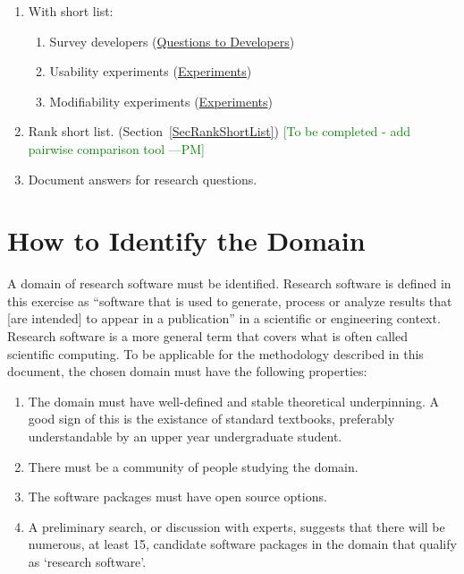 \documentclass[letterpaper,cleveref]{lipics-v2019}
\newcommand{\authornote}[3]{\textcolor{#1}{[#3 ---#2]}}
\newcommand{\authornote}[3]{}
\newcommand{\wss}[1]{\authornote{blue}{SS}{#1}} %
\newcommand{\pmi}[1]{\authornote{green}{PM}{#1}} %
\theoremstyle{definition}
\begin{document}
\begin{enumerate}
\item With short list:
\begin{enumerate}
\item Survey developers
  (\href{https://github.com/smiths/AIMSS/blob/master/StateOfPractice/Methodology/Questions
    to Developers.pdf}{Questions to Developers})
\item Usability experiments
  (\href{https://github.com/smiths/AIMSS/blob/master/StateOfPractice/Methodology/Experiments.pdf}{Experiments})
\item Modifiability experiments
  (\href{https://github.com/smiths/AIMSS/blob/master/StateOfPractice/Methodology/Experiments.pdf}{Experiments})
\end{enumerate}
\item Rank short list. (Section~\ref{SecRankShortList}) \pmi{To be completed -
    add pairwise comparison tool}
\item Document answers for research questions.
\end{enumerate}


\section{How to Identify the Domain} \label{SecIdentifyDomain} 

A domain of research software must be identified. Research software is defined
in this exercise as ``software that is used to generate, process or analyze
results that [are intended] to appear in a publication'' \citep{hettrick2014uk}
in a scientific or engineering context.  Research software is a more general
term that covers what is often called scientific computing.  To be applicable
for the methodology described in this document, the chosen domain must have the
following properties:

\begin{enumerate}
\item The domain must have well-defined and stable theoretical underpinning.  A
  good sign of this is the existance of standard textbooks, preferably
  understandable by an upper year undergraduate student.
\item There must be a community of people studying the domain.
\item The software packages must have open source options.
\item A preliminary search, or discussion with experts, suggests that there will
  be numerous, at least 15, candidate software packages in the domain that
  qualify as `research software'.
\end{enumerate}	
\end{document}
